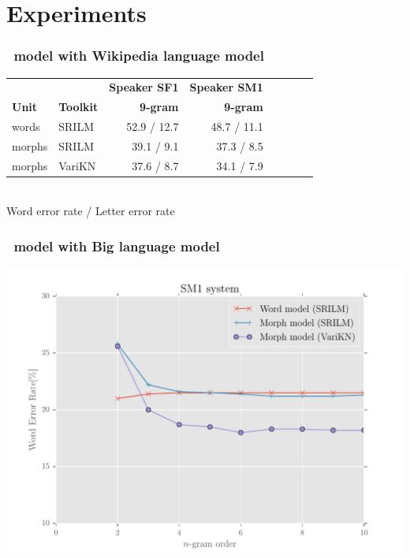 \section{Experiments}
\begin{frame}
\frametitle{\ns\ model with Wikipedia language model}

\begin{tabular}{ll|rrr|rrr}
& & \textbf{Speaker SF1} & \textbf{Speaker SM1} \\
 \textbf{Unit} & \textbf{Toolkit} & \textbf{9-gram} & \textbf{9-gram}\\\hline
 words & SRILM & 52.9 / 12.7&  48.7 / 11.1\\
morphs & SRILM & 39.1 / 9.1 &  37.3 / 8.5 \\
 morphs & VariKN   & 37.6 / 8.7 & 34.1 / 7.9 \\

\end{tabular}
\\[1cm]
Word error rate / Letter error rate\\
\end{frame}

\begin{frame}
\frametitle{\ns\ model with Big language model}
\includegraphics[width=.86\textwidth]{../figures/sme1}

\end{frame}

